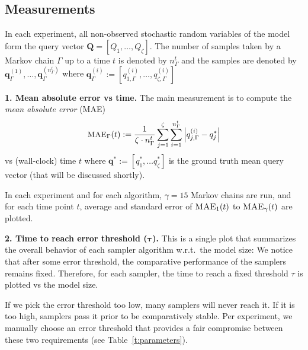 \documentclass[]{article}
\newcommand{\bvec}[1]{\textbf{#1}}
\begin{document}
\subsection{Measurements}
\label{sect:experimental.results.measures}
In each experiment, all non-observed stochastic random variables of the model  form the query vector $\bvec{Q} = [Q_1, \ldots, Q_\zeta]$.
The number of samples taken by a Markov chain $\Gamma$ up to a time $t$ is denoted by $n_{\Gamma}^t$ and  
the samples are denoted by 
$\bvec{q}_\Gamma^{(1)}, \ldots, \bvec{q}^{(n_{\Gamma}^t)}_\Gamma$
where $\bvec{q}_\Gamma^{(i)} := 
[q_{1, \Gamma}^{(i)} , \ldots, q_{\zeta, \Gamma}^{(i)}]$

{\bf 1. Mean absolute error vs time.}
The main measurement 
is to compute the \emph{mean absolute error} (MAE) 
\begin{equation}\footnotesize
\label{e:error.vs.time.measure}
\textsc{MAE}_{\Gamma}(t) := \frac{1}{\zeta \cdot n_\Gamma^t} 
\sum_{j=1}^{\zeta}
\sum_{i=1}^{n_\Gamma^t}
\left|{q}^{(i)}_{j, \Gamma} - {q}_j^* \right|
\end{equation}
vs (wall-clock) time $t$ where 
$\bvec{q}^* := [q_1^*, \ldots q_\zeta^*]$ 
is the ground truth mean query vector (that will be discussed shortly).

In each experiment and for each algorithm, $\gamma = 15$ Markov chains are run,  and for each time point $t$,
average and standard error of %
$\textsc{MAE}_{1}(t)$ to $\textsc{MAE}_{\gamma}(t)$
are plotted. 

{\bf 2. Time to reach error threshold ($\boldsymbol\tau$).}
This is a single plot that summarizes the overall behavior of each sampler algorithm w.r.t.\ the model size:
We notice that after some error threshold, the comparative performance of the samplers remains fixed.
Therefore, for each sampler, the time to reach a fixed threshold $\tau$ is plotted vs the model size.

If we pick the error threshold too low, many samplers will never reach it. 
If it is too high, samplers pass it prior to be comparatively stable. 
Per experiment, we manually choose  an error threshold that provides a fair compromise between these two requirements
(see Table~\ref{t:parameters}).
\end{document}
